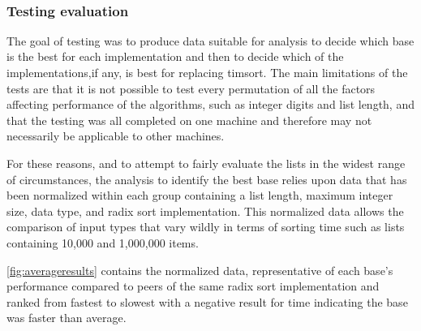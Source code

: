 \documentclass[12pt]{article}
\begin{document}
\begin{table}[h]
{\begin{minipage}[h]{.6\linewidth}
			\end{minipage}

		}
		\\	
		\vspace{1cm}

		\label{fig:sml_Nearly_Sorted_nolp_1}

	\end{table}



	\subsubsection{Testing evaluation}
	The goal of testing was to produce data suitable for analysis to decide which base is the best for each implementation and then to decide which of the implementations,if any, is best for replacing timsort. The main limitations of the tests are that it is not possible to test every permutation of all the factors affecting performance of the algorithms, such as integer digits and list length, and that the testing was all completed on one machine and therefore may not necessarily be applicable to other machines. 
	\par For these reasons, and to attempt to fairly evaluate the lists in the widest range of circumstances, the analysis to identify the best base relies upon data that has been normalized within each group containing a list length, maximum integer size, data type, and radix sort implementation. This normalized data allows the comparison of input types that vary wildly in terms of sorting time such as lists containing 10,000 and 1,000,000 items.
	\par
	\autoref{fig:averageresults} contains the normalized data, representative of each base's performance compared to peers of the same radix sort implementation and ranked from fastest to slowest with a negative result for time indicating the base was faster than average.
\end{document}
